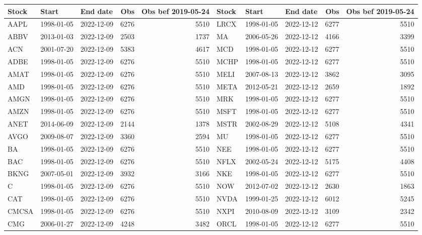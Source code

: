 \begin{table}[ht]
\centering
\begin{tabular}{lllrrlllrr}
  \hline
Stock & Start & End date & Obs & Obs bef 2019-05-24 & Stock & Start & End date & Obs & Obs bef 2019-05-24 \\ 
  \hline
AAPL & 1998-01-05 & 2022-12-09 & 6276 & 5510 & LRCX & 1998-01-05 & 2022-12-12 & 6277 & 5510 \\ 
  ABBV & 2013-01-03 & 2022-12-09 & 2503 & 1737 & MA & 2006-05-26 & 2022-12-12 & 4166 & 3399 \\ 
  ACN & 2001-07-20 & 2022-12-09 & 5383 & 4617 & MCD & 1998-01-05 & 2022-12-12 & 6277 & 5510 \\ 
  ADBE & 1998-01-05 & 2022-12-09 & 6276 & 5510 & MCHP & 1998-01-05 & 2022-12-12 & 6277 & 5510 \\ 
  AMAT & 1998-01-05 & 2022-12-09 & 6276 & 5510 & MELI & 2007-08-13 & 2022-12-12 & 3862 & 3095 \\ 
  AMD & 1998-01-05 & 2022-12-09 & 6276 & 5510 & META & 2012-05-21 & 2022-12-12 & 2659 & 1892 \\ 
  AMGN & 1998-01-05 & 2022-12-09 & 6276 & 5510 & MRK & 1998-01-05 & 2022-12-12 & 6277 & 5510 \\ 
  AMZN & 1998-01-05 & 2022-12-09 & 6276 & 5510 & MSFT & 1998-01-05 & 2022-12-12 & 6277 & 5510 \\ 
  ANET & 2014-06-09 & 2022-12-09 & 2144 & 1378 & MSTR & 2002-08-29 & 2022-12-12 & 5108 & 4341 \\ 
  AVGO & 2009-08-07 & 2022-12-09 & 3360 & 2594 & MU & 1998-01-05 & 2022-12-12 & 6277 & 5510 \\ 
  BA & 1998-01-05 & 2022-12-09 & 6276 & 5510 & NEE & 1998-01-05 & 2022-12-12 & 6277 & 5510 \\ 
  BAC & 1998-01-05 & 2022-12-09 & 6276 & 5510 & NFLX & 2002-05-24 & 2022-12-12 & 5175 & 4408 \\ 
  BKNG & 2007-05-01 & 2022-12-09 & 3932 & 3166 & NKE & 1998-01-05 & 2022-12-12 & 6277 & 5510 \\ 
  C & 1998-01-05 & 2022-12-09 & 6276 & 5510 & NOW & 2012-07-02 & 2022-12-12 & 2630 & 1863 \\ 
  CAT & 1998-01-05 & 2022-12-09 & 6276 & 5510 & NVDA & 1999-01-25 & 2022-12-12 & 6012 & 5245 \\ 
  CMCSA & 1998-01-05 & 2022-12-09 & 6276 & 5510 & NXPI & 2010-08-09 & 2022-12-12 & 3109 & 2342 \\ 
  CMG & 2006-01-27 & 2022-12-09 & 4248 & 3482 & ORCL & 1998-01-05 & 2022-12-12 & 6277 & 5510 \\ 

\end{tabular}
\end{table}
